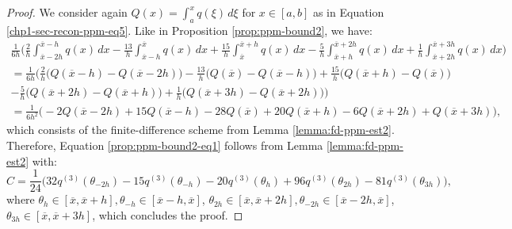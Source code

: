 \begin{proof}
	We consider again $Q(x) = \int_{a}^{x} q(\xi) \,d\xi$ for $x \in [a,b]$ as in 
	Equation \eqref{chp1-sec-recon-ppm-eq5}. 
	Like in Proposition \ref{prop:ppm-bound2}, we have:
	\begin{align*}
	\frac{1}{6h}
	\bigg( \frac{2}{h} \int_{\overline{x}-2h}^{\overline{x}-h} q(x) \,dx 
		      -\frac{13}{h}\int_{\overline{x}-h}^{\overline{x}} q(x) \,dx   
		      +\frac{15}{h}\int_{\overline{x}}^{\overline{x}+h} q(x) \,dx 
		      -\frac{5}{h} \int_{\overline{x}+h}^{\overline{x}+2h} q(x) \,dx   
		      +\frac{1}{h} \int_{\overline{x}+2h}^{\overline{x}+3h} q(x) \,dx   
		\bigg)\\
		= \frac{1}{6h} \bigg(
		\frac{2}{h}   \big( Q(\overline{x}-h)- Q(\overline{x}-2h)\big) 
		-\frac{13}{h} \big( Q(\overline{x}) - Q(\overline{x}-h) \big) 
		+\frac{15}{h} \big( Q(\overline{x}+h) - Q(\overline{x})  \big) \\
		-\frac{5}{h}  \big( Q(\overline{x}+2h) - Q(\overline{x}+h)  \big) 
		+\frac{1}{h}  \big( Q(\overline{x}+3h) - Q(\overline{x}+2h)  \big) 
		\bigg)\\
		= \frac{1}{6h^2}\bigg(-2Q(\overline{x}-2h) + 15Q(\overline{x}-h) - 28Q(\overline{x}) 
		+20Q(\overline{x}+h) -6Q(\overline{x}+2h) + Q(\overline{x}+3h)  \bigg),
	\end{align*}
	which consists of the finite-difference scheme from Lemma \ref{lemma:fd-ppm-est2}. 
	Therefore, Equation \eqref{prop:ppm-bound2-eq1} follows from 
	Lemma \ref{lemma:fd-ppm-est2} with:
	\begin{equation}
		\label{prop:ppm-bound2-eq2}
		C = \frac{1}{24}\bigg(32q^{(3)}(\theta_{-2h}) - 15q^{(3)}(\theta_{-h}) -20q^{(3)}(\theta_{h}) +96 q^{(3)}(\theta_{2h}) - 81q^{(3)}(\theta_{3h})\bigg), 
	\end{equation}
	where $\theta_{h} \in [\overline{x},\overline{x}+h], \theta_{-h}\in [\overline{x}-h,\overline{x}]$, 
	$\theta_{2h} \in [\overline{x},\overline{x}+2h], \theta_{-2h}\in [\overline{x}-2h,\overline{x}]$,
	$\theta_{3h} \in [\overline{x},\overline{x}+3h]$,
	which concludes the proof.

\renewcommand\qedsymbol{} %
\end{proof}

